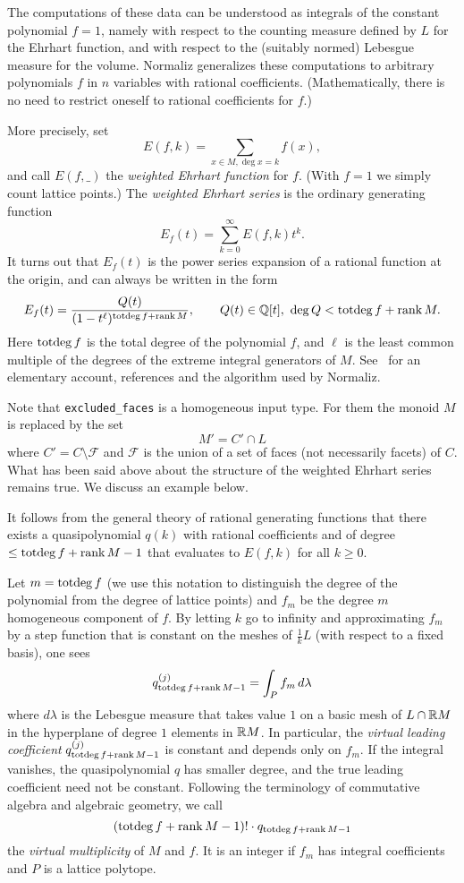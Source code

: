The computations of these data can be understood as integrals of the
constant polynomial $f=1$, namely with respect to the counting
measure defined by $L$ for the Ehrhart function, and with
respect to the (suitably normed) Lebesgue measure for the
volume. Normaliz generalizes these computations to
arbitrary polynomials $f$ in $n$ variables with rational
coefficients. (Mathematically, there is no need to restrict
oneself to rational coefficients for $f$.)

More precisely, set
$$
E(f,k)=\sum_{x\in M, \deg x=k} f(x),
$$
and call $E(f,\_)$ the \emph{weighted Ehrhart function} for
$f$. (With $f=1$ we simply count lattice points.) The
\emph{weighted Ehrhart series} is the ordinary generating
function
$$
E_f(t)=\sum_{k=0}^\infty E(f,k)t^k.
$$
It turns out that $E_f(t)$ is the power series expansion of a
rational function at the origin, and can always be written in
the form
$$
E_f(t)=\frac{Q(t)}{(1-t^\ell)^{\operatorname{totdeg} f+\operatorname{rank} M}},\qquad Q(t)\in{\mathbb Q}[t],\
\deg Q< \operatorname{totdeg} f+\operatorname{rank} M.
$$
Here $\operatorname{totdeg} f$ is the total degree of the polynomial $f$, and
$\ell$ is the least common multiple of the degrees of the
extreme integral generators of $M$. See~\cite{BS} for an
elementary account, references and the algorithm used by Normaliz.

Note that \verb|excluded_faces| is a homogeneous input type. For them the monoid $M$ is replaced by the set
$$
M'=C'\cap L
$$
where $C'=C\setminus \mathcal F$ and $\mathcal F$ is the union of a set of
faces
(not necessarily facets) of $C$. What has been said above about the structure
of the weighted Ehrhart series remains true. We discuss an example below.

It follows from the general theory of rational generating
functions that there exists a quasipolynomial $q(k)$ with
rational coefficients and of degree $\le \operatorname{totdeg} f+\operatorname{rank} M-1$ that
evaluates to $E(f,k)$ for all $k\ge 0$.

Let $m=\operatorname{totdeg} f$ (we use this notation to distinguish the degree of the polynomial from the degree of lattice points) and $f_m$ be the degree $m$ homogeneous
component of $f$. By letting $k$ go to infinity and
approximating $f_m$ by a step function that is constant on the
meshes of $\frac 1kL$ (with respect to a fixed basis), one sees
$$
q^{(j)}_{\operatorname{totdeg} f+\operatorname{rank} M-1}=\int_P f_m\, d\lambda
$$
where $d\lambda$ is the Lebesgue measure that takes value $1$
on a basic mesh of $L\cap {\mathbb R} M$ in the hyperplane of degree
$1$ elements in ${\mathbb R} M$. In particular, the \emph{virtual
	leading coefficient} $q^{(j)}_{\operatorname{totdeg} f+\operatorname{rank} M-1}$ is
constant and depends only on $f_m$. If the integral vanishes,
the quasipolynomial $q$ has smaller degree, and the true
leading coefficient need not be constant. Following the
terminology of commutative algebra and algebraic geometry, we
call
$$
(\operatorname{totdeg} f+\operatorname{rank} M-1)!\cdot q_{\operatorname{totdeg} f+\operatorname{rank} M-1}
$$
the \emph{virtual multiplicity} of $M$ and $f$. It is an
integer if $f_m$ has integral coefficients and $P$ is a lattice
polytope.

